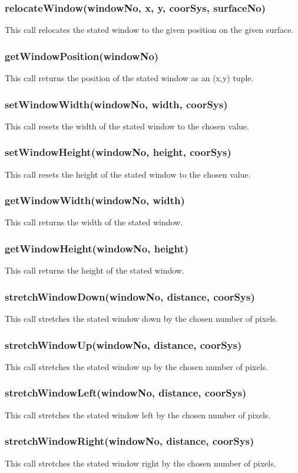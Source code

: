 \documentclass{acm_proc_article-sp}
\begin{document}
\subsubsection{relocateWindow(windowNo, x, y, coorSys, surfaceNo)}
This call relocates the stated window to the given position on the given surface.
\subsubsection{getWindowPosition(windowNo)}
This call returns the position of the stated window as an (x,y) tuple.
\subsubsection{setWindowWidth(windowNo, width, coorSys)}
This call resets the width of the stated window to the chosen value.
\subsubsection{setWindowHeight(windowNo, height, coorSys)}
This call resets the height of the stated window to the chosen value.
\subsubsection{getWindowWidth(windowNo, width)}
This call returns the width of the stated window.
\subsubsection{getWindowHeight(windowNo, height)}
This call returns the height of the stated window.
\subsubsection{stretchWindowDown(windowNo, distance, coorSys)}
This call stretches the stated window down by the chosen number of pixels.
\subsubsection{stretchWindowUp(windowNo, distance, coorSys)}
This call stretches the stated window up by the chosen number of pixels.
\subsubsection{stretchWindowLeft(windowNo, distance, coorSys)}
This call stretches the stated window left by the chosen number of pixels.
\subsubsection{stretchWindowRight(windowNo, distance, coorSys)}
This call stretches the stated window right by the chosen number of pixels.
\end{document}
